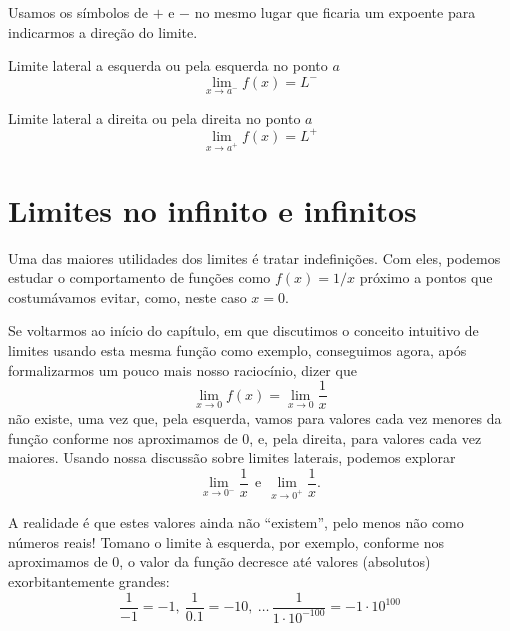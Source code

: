 \documentclass[
  portuguese,
  letterpaper,
  DIV=11,
  numbers=noendperiod]{scrreport}
\begin{document}
\begin{tcolorbox}[enhanced jigsaw, leftrule=.75mm, coltitle=black, title=\textcolor{quarto-callout-note-color}{\faInfo}\hspace{0.5em}{Notação}, colbacktitle=quarto-callout-note-color!10!white, colback=white, colframe=quarto-callout-note-color-frame, left=2mm, bottomtitle=1mm, titlerule=0mm, breakable, opacityback=0, opacitybacktitle=0.6, arc=.35mm, toptitle=1mm, rightrule=.15mm, bottomrule=.15mm, toprule=.15mm]

Usamos os símbolos de \(+\) e \(-\) no mesmo lugar que ficaria um
expoente para indicarmos a direção do limite.

Limite lateral a esquerda ou pela esquerda no ponto \(a\) \[
\lim_{x \rightarrow a^{-}} f(x) = L^-
\]

Limite lateral a direita ou pela direita no ponto \(a\) \[
\lim_{x \rightarrow a^{+}} f(x) = L^+
\]

\end{tcolorbox}

\section{Limites no infinito e
infinitos}\label{limites-no-infinito-e-infinitos}

Uma das maiores utilidades dos limites é tratar indefinições. Com eles,
podemos estudar o comportamento de funções como \(f(x) = 1/x\) próximo a
pontos que costumávamos evitar, como, neste caso \(x=0\).

Se voltarmos ao início do capítulo, em que discutimos o conceito
intuitivo de limites usando esta mesma função como exemplo, conseguimos
agora, após formalizarmos um pouco mais nosso raciocínio, dizer que \[
\lim_{x\rightarrow 0} f(x) = \lim_{x \rightarrow 0} \frac{1}{x}
\] não existe, uma vez que, pela esquerda, vamos para valores cada vez
menores da função conforme nos aproximamos de \(0\), e, pela direita,
para valores cada vez maiores. Usando nossa discussão sobre limites
laterais, podemos explorar \[
\lim_{x\rightarrow 0^-}\frac{1}{x}\ \ \text{e}\ \ \lim_{x\rightarrow 0^+}\frac{1}{x}.
\]

A realidade é que estes valores ainda não ``existem'', pelo menos não
como números reais! Tomano o limite à esquerda, por exemplo, conforme
nos aproximamos de \(0\), o valor da função decresce até valores
(absolutos) exorbitantemente grandes: \[
\frac{1}{-1} = -1,\ \frac{1}{0.1} = -10,\ \dots \, \frac{1}{1 \cdot 10^{-100}} =
-1 \cdot 10^{100}
\]
\end{document}
